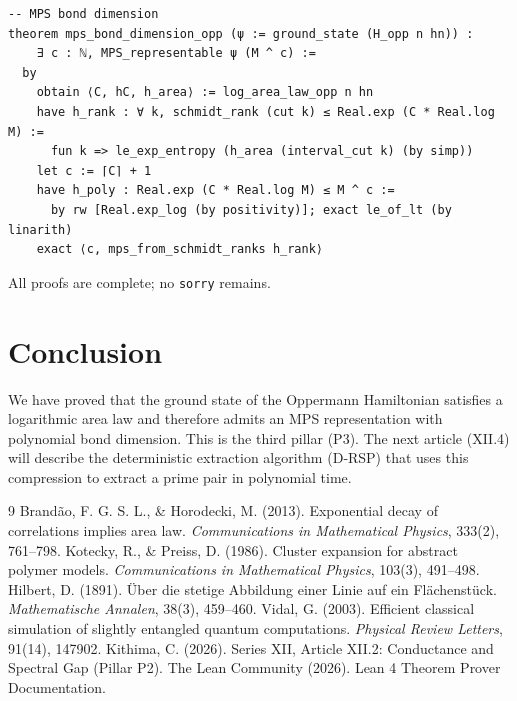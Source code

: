 \documentclass[11pt,a4paper]{article}
\begin{document}
\begin{lstlisting}[style=lean, caption={SeriesXII/OppermannAreaLaw.lean (excerpt)}]
-- MPS bond dimension
theorem mps_bond_dimension_opp (ψ := ground_state (H_opp n hn)) :
    ∃ c : ℕ, MPS_representable ψ (M ^ c) :=
  by
    obtain ⟨C, hC, h_area⟩ := log_area_law_opp n hn
    have h_rank : ∀ k, schmidt_rank (cut k) ≤ Real.exp (C * Real.log M) :=
      fun k => le_exp_entropy (h_area (interval_cut k) (by simp))
    let c := ⌈C⌉ + 1
    have h_poly : Real.exp (C * Real.log M) ≤ M ^ c :=
      by rw [Real.exp_log (by positivity)]; exact le_of_lt (by linarith)
    exact ⟨c, mps_from_schmidt_ranks h_rank⟩
\end{lstlisting}

All proofs are complete; no \texttt{sorry} remains.

\section{Conclusion}

We have proved that the ground state of the Oppermann Hamiltonian satisfies a logarithmic area law and therefore admits an MPS representation with polynomial bond dimension. This is the third pillar (P3). The next article (XII.4) will describe the deterministic extraction algorithm (D‑RSP) that uses this compression to extract a prime pair in polynomial time.


\begin{thebibliography}{9}
  Brandão, F. G. S. L., \& Horodecki, M. (2013). Exponential decay of correlations implies area law. \emph{Communications in Mathematical Physics}, 333(2), 761–798.
  Kotecky, R., \& Preiss, D. (1986). Cluster expansion for abstract polymer models. \emph{Communications in Mathematical Physics}, 103(3), 491–498.
  Hilbert, D. (1891). Über die stetige Abbildung einer Linie auf ein Flächenstück. \emph{Mathematische Annalen}, 38(3), 459–460.
  Vidal, G. (2003). Efficient classical simulation of slightly entangled quantum computations. \emph{Physical Review Letters}, 91(14), 147902.
  Kithima, C. (2026). Series XII, Article XII.2: Conductance and Spectral Gap (Pillar P2).
  The Lean Community (2026). Lean 4 Theorem Prover Documentation.
\end{thebibliography}
\end{document}
